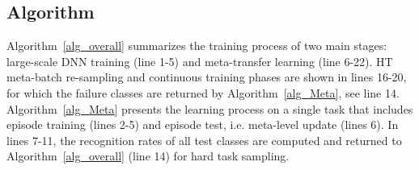 \subsection{Algorithm}
\label{sec_alg}

Algorithm~\ref{alg_overall} summarizes the training process of two main stages: large-scale DNN training (line 1-5) and meta-transfer learning (line 6-22). HT meta-batch re-sampling and continuous training phases are shown in lines 16-20, for which the failure classes are returned by Algorithm~\ref{alg_Meta}, see line 14.
Algorithm~\ref{alg_Meta} presents the learning process on a single task that includes episode training (lines 2-5) and episode test, i.e. meta-level update (lines 6). In lines 7-11, the recognition rates of all test classes are computed and returned to Algorithm~\ref{alg_overall} (line 14) for hard task sampling.





